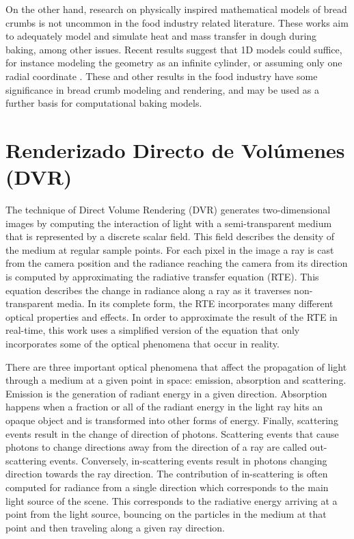 On the other hand, research on physically inspired mathematical models of bread crumbs is not uncommon in the food industry related literature.
These works aim to adequately model and simulate heat and mass transfer in dough during baking, among other issues.
Recent results suggest that 1D models could suffice, for instance modeling the geometry as an infinite cylinder, or assuming only one radial coordinate \cite{Purlis2012, Thorvaldsson1999}.
These and other results in the food industry have some significance in bread crumb modeling and rendering, and may be used as a further basis for computational baking models. 


\section{Renderizado Directo de Volúmenes (DVR)}
The technique of Direct Volume Rendering (DVR)\cite{Kratz2006} generates two-dimensional images by computing the interaction of light with a semi-transparent medium that is represented by a discrete scalar field.
This field describes the density of the medium at regular sample points. 
For each pixel in the image a ray is cast from the camera position and the radiance reaching the camera from its direction is computed by approximating the radiative transfer equation (RTE). This equation describes the change in radiance along a ray as it traverses non-transparent media.
In its complete form, the RTE incorporates many different optical properties and effects. 
In order to approximate the result of the RTE in real-time, this work uses a simplified version of the equation that only incorporates some of the optical phenomena that occur in reality.

There are three important optical phenomena that affect the propagation of light through a medium at a given point in space: emission, absorption and scattering.
Emission is the generation of radiant energy in a given direction.
Absorption happens when a fraction or all of the radiant energy in the light ray hits an opaque object and is transformed into other forms of energy. 
%
Finally, scattering events result in the change of direction of photons. 
Scattering events that cause photons to change directions away from the direction of a ray are called out-scattering events. Conversely, in-scattering events result in photons changing direction towards the ray direction.
%
The contribution of in-scattering is often computed for radiance from a single direction which corresponds to the main light source of the scene.
This corresponds to the radiative energy arriving at a point from the light source, bouncing on the particles in the medium at that point and then traveling along a given ray direction.

